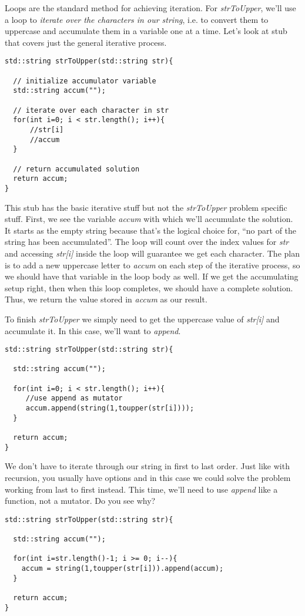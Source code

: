 \documentclass[]{tufte-handout}
\begin{document}
Loops are the standard method for achieving iteration. For \textit{strToUpper}, we'll use a loop to \textit{iterate over the characters in our string}, i.e. to convert them to uppercase and accumulate them in a variable one at a time. Let's look at stub that covers just the general iterative process.

\begin{verbatim}
std::string strToUpper(std::string str){
  
  // initialize accumulator variable 
  std::string accum("");

  // iterate over each character in str	  
  for(int i=0; i < str.length(); i++){
      //str[i] 
      //accum  
  }
  
  // return accumulated solution 
  return accum;
}
\end{verbatim}
This stub has the basic iterative stuff but not the \textit{strToUpper} problem specific stuff.  First, we see the variable \textit{accum} with which we'll accumulate the solution. It starts as the empty string because that's the logical choice for, ``no part of the string has been accumulated''. The loop will count over the index values for \textit{str} and accessing \textit{str[i]} inside the loop will guarantee we get each character.  The plan is to add a new uppercase letter to \textit{accum} on each step of the iterative process, so we should have that variable in the loop body as well.  If we get the accumulating setup right, then when this loop completes, we should have a complete solution.  Thus, we return the value stored in \textit{accum} as our result.  

To finish \textit{strToUpper} we simply need to get the uppercase value of \textit{str[i]} and accumulate it.  In this case, we'll want to \textit{append}.
\begin{verbatim}
std::string strToUpper(std::string str){
 
  std::string accum("");
  
  for(int i=0; i < str.length(); i++){
     //use append as mutator
     accum.append(string(1,toupper(str[i])));
  }
  
  return accum;
}
\end{verbatim}

We don't have to iterate through our string in first to last order.  Just like with recursion, you usually have options and in this case we could solve the problem working from last to first instead. This time, we'll need to use \textit{append} like a function, not a mutator. Do you see why?
\begin{verbatim}
std::string strToUpper(std::string str){
 
  std::string accum("");
  
  for(int i=str.length()-1; i >= 0; i--){
	accum = string(1,toupper(str[i])).append(accum);
  }
  
  return accum;
}
\end{verbatim}
\end{document}
